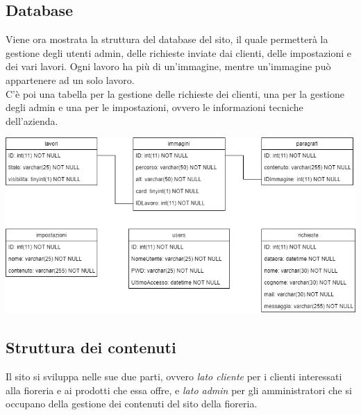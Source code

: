 \subsection{Database}
Viene ora mostrata la struttura del database del sito, il quale permetterà la gestione degli utenti admin, delle richieste inviate dai clienti, delle impostazioni e dei vari lavori. Ogni lavoro ha più di un'immagine, mentre un'immagine può appartenere ad un solo lavoro.\\C'è poi una tabella per la gestione delle richieste dei clienti, una per la gestione degli admin e una per le impostazioni, ovvero le informazioni tecniche dell'azienda.
\begin{center}
\includegraphics[scale = 0.5]{../latex/images/db.png}\\[1.5cm]
\end{center}

\subsection{Struttura dei contenuti}
Il sito si sviluppa nelle sue due parti, ovvero \textit{lato cliente} per i clienti interessati alla fioreria e ai prodotti che essa offre, e \textit{lato admin} per gli amministratori che si occupano della gestione dei contenuti del sito della fioreria. 

